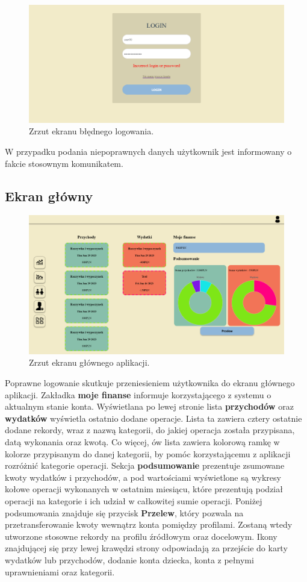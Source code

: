 \documentclass[12pt,a4paper,oneside]{article}
\begin{document}
\begin{figure}[H]
    \centering
    \includegraphics[width=\hsize,keepaspectratio]{images/login_failed.png}
    \caption{Zrzut ekranu błędnego logowania.}
\end{figure}
W przypadku podania niepoprawnych danych użytkownik jest informowany o fakcie
stosownym komunikatem.

\subsection{Ekran główny}
\begin{figure}[H]
    \centering
    \includegraphics[width=\hsize,keepaspectratio]{images/profile.png}
    \caption{Zrzut ekranu głównego aplikacji.}
\end{figure}
Poprawne logowanie skutkuje przeniesieniem użytkownika do ekranu głównego
aplikacji. Zakładka \textbf{moje finanse} informuje korzystającego z systemu o
aktualnym stanie konta. Wyświetlana po lewej stronie lista \textbf{przychodów}
oraz \textbf{wydatków} wyświetla ostatnio dodane operacje. Lista ta zawiera
cztery ostatnie dodane rekordy, wraz z nazwą kategorii, do jakiej operacja
została przypisana, datą wykonania oraz kwotą. Co więcej, ów lista zawiera
kolorową ramkę w kolorze przypisanym do danej kategorii, by pomóc korzystającemu
z aplikacji rozróżnić kategorie operacji. Sekcja \textbf{podsumowanie}
prezentuje zsumowane kwoty wydatków i przychodów, a pod wartościami wyświetlone
są wykresy kołowe operacji wykonanych w ostatnim miesiącu,
które prezentują podział operacji na kategorie i ich udział w
całkowitej sumie operacji. Poniżej podsumowania znajduje się przycisk
\textbf{Przelew}, który pozwala na przetransferowanie kwoty wewnątrz konta
pomiędzy profilami. Zostaną wtedy utworzone stosowne rekordy na profilu źródłowym
oraz docelowym. Ikony znajdującej się przy lewej krawędzi strony odpowiadają za
przejście do karty wydatków lub przychodów, dodanie konta dziecka, konta 
z pełnymi uprawnieniami oraz kategorii.
\end{document}
